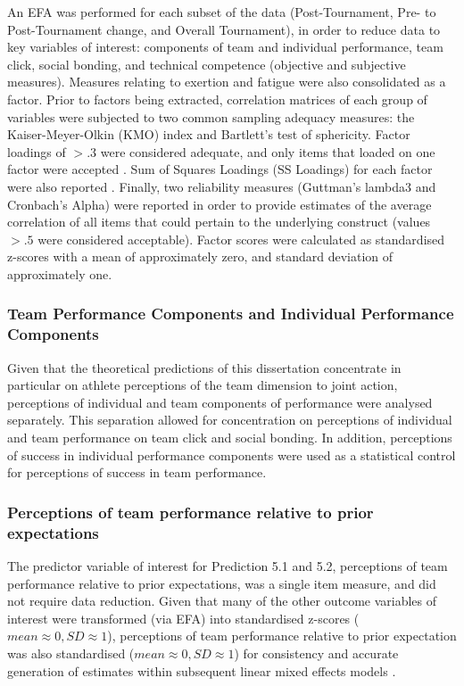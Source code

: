 \begin{CJK}{UTF8}{gbsn}
An EFA was performed for each subset of the data (Post-Tournament, Pre- to Post-Tournament change, and Overall Tournament), in order to reduce data to key variables of interest: components of team and individual performance, team click, social bonding, and technical competence (objective and subjective measures).  Measures relating to exertion and fatigue were also consolidated as a factor.  Prior to factors being extracted, correlation matrices of each group of variables were subjected to two common sampling adequacy measures: the Kaiser-Meyer-Olkin (KMO) index and Bartlett’s test of sphericity.  Factor loadings of $> .3$ were considered adequate, and only items that loaded on one factor were accepted \citep{Field2012}. Sum of Squares Loadings (SS Loadings) for each factor were also reported \citep{Dziuban1974}.  Finally, two reliability measures (Guttman's lambda3 and Cronbach's Alpha) were reported in order to provide estimates of the average correlation of all items that could pertain to the underlying construct (values  $> .5$ were considered acceptable).  Factor scores were calculated as standardised z-scores with a mean of approximately zero, and standard deviation of approximately one.

\subsubsection{Team Performance Components and Individual Performance Components}
Given that the theoretical predictions of this dissertation concentrate in particular on athlete perceptions of the team dimension to joint action, perceptions of individual and team components of performance were analysed separately.  This separation allowed for concentration on perceptions of individual and team performance on team click and social bonding. In addition, perceptions of success in individual performance components were used as a statistical control for perceptions of success in team performance.


\subsubsection{Perceptions of team performance relative to prior expectations}
The predictor variable of interest for Prediction 5.1 and 5.2, perceptions of team performance relative to prior expectations, was a single item measure, and did not require data reduction.  Given that many of the other outcome variables of interest were transformed (via EFA) into standardised z-scores ($mean \approx 0, SD \approx 1$), perceptions of team performance relative to prior expectation was also standardised ($mean \approx 0, SD \approx 1$) for consistency and accurate generation of estimates within subsequent linear mixed effects models \citep{Bates2015}.


\end{CJK}
